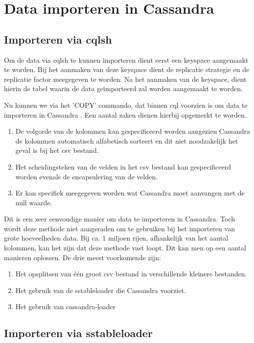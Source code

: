 \chapter{Data importeren in Cassandra}
\label{ch:cassandra_import}

\section{Importeren via cqlsh}
Om de data via cqlsh te kunnen importeren dient eerst een keyspace aangemaakt te worden.
Bij het aanmaken van deze keyspace dient de replicatie strategie en de replicatie factor meegegeven te worden.
Na het aanmaken van de keyspace, dient hierin de tabel waarin de data geïmporteerd zal  worden aangemaakt te worden.

Nu kunnen we via het 'COPY' commando, dat binnen cql voorzien is om data te importeren in Cassandra \citep{Cannon2012Import}.
Een aantal zaken dienen hierbij opgemerkt te worden.

\begin{enumerate}
	\item De volgorde van de kolommen kan gespecificeerd worden aangezien Cassandra de kolommen automatisch alfabetisch sorteert en dit niet noodzakelijk het geval is bij het csv bestand.
	\item Het scheidingsteken van de velden in het csv bestand kan gespecificeerd worden evenals de encapsulering van de velden.
	\item Er kan specifiek meegegeven worden wat Cassandra moet aanvangen met de null waarde.
\end{enumerate}

Dit is een zeer eenvoudige manier om data te importeren in Cassandra.
Toch wordt deze methode niet aangeraden om te gebruiken bij het importeren van grote hoeveelheden data.
Bij ca. 1 miljoen rijen, afhankelijk van het aantal kolommen, kan het zijn dat deze methode vast loopt.
Dit kan men op een aantal manieren oplossen.
De drie meest voorkomende zijn:

\begin{enumerate}
	\item Het opsplitsen van één groot csv bestand in verschillende kleinere bestanden.
	\item Het gebruik van de sstableloader die Cassandra voorziet.
	\item Het gebruik van cassandra-loader
\end{enumerate}

\section{Importeren via sstableloader}

